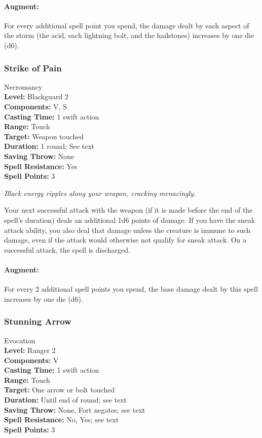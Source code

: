 \paragraph{Augment:} For every additional spell point you spend, the damage dealt by each aspect of the storm (the acid, each lightning bolt, and the hailstones) increases by one die (d6).
\subsubsection{Strike of Pain}
\label{Spell:StrikeOfPain}
Necromancy
\\ \textbf{Level:} Blackguard 2
\\ \textbf{Components:} V, S
\\ \textbf{Casting Time:} 1 swift action
\\ \textbf{Range:} Touch
\\ \textbf{Target:} Weapon touched
\\ \textbf{Duration:} 1 round; See text
\\ \textbf{Saving Throw:} None
\\ \textbf{Spell Resistance:} Yes
\\ \textbf{Spell Points:} 3

\emph{Black energy ripples along your weapon, cracking menacingly.}

Your next successful attack with the weapon (if it is made before the end of the spell's duration) deals an additional 1d6 points of damage.
If you have the sneak attack ability, you also deal that damage unless the creature is immune to such damage, even if the attack would otherwise not qualify for sneak attack.
On a successful attack, the spell is discharged.

\paragraph{Augment:} For every 2 additional spell points you spend, the base damage dealt by this spell increases by one die (d6).
\subsubsection{Stunning Arrow}
\label{Spell:StunningArrow}
Evocation
\\ \textbf{Level:} Ranger 2
\\ \textbf{Components:} V
\\ \textbf{Casting Time:} 1 swift action
\\ \textbf{Range:} Touch
\\ \textbf{Target:} One arrow or bolt touched
\\ \textbf{Duration:} Until end of round; see text
\\ \textbf{Saving Throw:} None, Fort negates; see text
\\ \textbf{Spell Resistance:} No, Yes; see text
\\ \textbf{Spell Points:} 3


